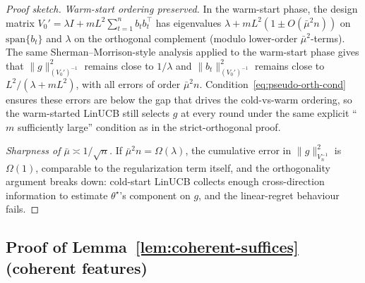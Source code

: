 \documentclass{article}
\theoremstyle{definition}
\theoremstyle{remark}
\theoremstyle{remark}
\begin{document}
\begin{proof}[Proof sketch]
\emph{Warm-start ordering preserved.}
In the warm-start phase, the design matrix
$V_0'=\lambda I+mL^2\sum_{t=1}^n b_tb_t^\top$ has eigenvalues
$\lambda+mL^2(1\pm O(\bar\mu^2 n))$ on $\mathrm{span}\{b_t\}$ and
$\lambda$ on the orthogonal complement (modulo lower-order
$\bar\mu^2$-terms). The same Sherman--Morrison-style analysis applied
to the warm-start phase gives that
$\|g\|_{(V_0')^{-1}}^2$ remains close to $1/\lambda$ and
$\|b_t\|_{(V_0')^{-1}}^2$ remains close to $L^2/(\lambda+mL^2)$, with
all errors of order $\bar\mu^2 n$. Condition~\eqref{eq:pseudo-orth-cond}
ensures these errors are below the gap that drives the cold-vs-warm
ordering, so the warm-started LinUCB still selects $g$ at every round
under the same explicit ``$m$ sufficiently large'' condition as in the
strict-orthogonal proof.

\emph{Sharpness of $\bar\mu\asymp 1/\sqrt n$.} If $\bar\mu^2 n=\Omega(\lambda)$,
the cumulative error in $\|g\|_{V_n^{-1}}^2$ is $\Omega(1)$, comparable
to the regularization term itself, and the orthogonality argument
breaks down: cold-start LinUCB collects enough cross-direction
information to estimate $\theta^\star$'s component on $g$, and the
linear-regret behaviour fails.
\end{proof}


\subsection{Proof of Lemma~\ref{lem:coherent-suffices} (coherent features)}
\label{app:proof-coherent}
\end{document}
